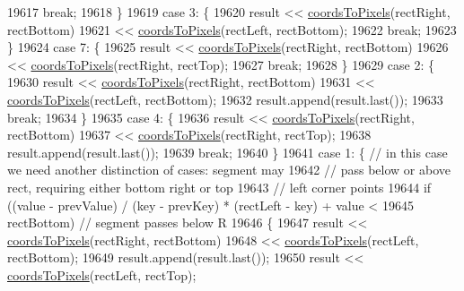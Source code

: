 \begin{DoxyCode}
19617       \textcolor{keywordflow}{break};
19618     \}
19619     \textcolor{keywordflow}{case} 3: \{
19620       result << \hyperlink{class_q_c_p_abstract_plottable_ade710a776104b14c1c835168ce1bfc5c}{coordsToPixels}(rectRight, rectBottom)
19621              << \hyperlink{class_q_c_p_abstract_plottable_ade710a776104b14c1c835168ce1bfc5c}{coordsToPixels}(rectLeft, rectBottom);
19622       \textcolor{keywordflow}{break};
19623     \}
19624     \textcolor{keywordflow}{case} 7: \{
19625       result << \hyperlink{class_q_c_p_abstract_plottable_ade710a776104b14c1c835168ce1bfc5c}{coordsToPixels}(rectRight, rectBottom)
19626              << \hyperlink{class_q_c_p_abstract_plottable_ade710a776104b14c1c835168ce1bfc5c}{coordsToPixels}(rectRight, rectTop);
19627       \textcolor{keywordflow}{break};
19628     \}
19629     \textcolor{keywordflow}{case} 2: \{
19630       result << \hyperlink{class_q_c_p_abstract_plottable_ade710a776104b14c1c835168ce1bfc5c}{coordsToPixels}(rectRight, rectBottom)
19631              << \hyperlink{class_q_c_p_abstract_plottable_ade710a776104b14c1c835168ce1bfc5c}{coordsToPixels}(rectLeft, rectBottom);
19632       result.append(result.last());
19633       \textcolor{keywordflow}{break};
19634     \}
19635     \textcolor{keywordflow}{case} 4: \{
19636       result << \hyperlink{class_q_c_p_abstract_plottable_ade710a776104b14c1c835168ce1bfc5c}{coordsToPixels}(rectRight, rectBottom)
19637              << \hyperlink{class_q_c_p_abstract_plottable_ade710a776104b14c1c835168ce1bfc5c}{coordsToPixels}(rectRight, rectTop);
19638       result.append(result.last());
19639       \textcolor{keywordflow}{break};
19640     \}
19641     \textcolor{keywordflow}{case} 1: \{ \textcolor{comment}{// in this case we need another distinction of cases: segment may}
19642               \textcolor{comment}{// pass below or above rect, requiring either bottom right or top}
19643               \textcolor{comment}{// left corner points}
19644       \textcolor{keywordflow}{if} ((value - prevValue) / (key - prevKey) * (rectLeft - key) + value <
19645           rectBottom) \textcolor{comment}{// segment passes below R}
19646       \{
19647         result << \hyperlink{class_q_c_p_abstract_plottable_ade710a776104b14c1c835168ce1bfc5c}{coordsToPixels}(rectRight, rectBottom)
19648                << \hyperlink{class_q_c_p_abstract_plottable_ade710a776104b14c1c835168ce1bfc5c}{coordsToPixels}(rectLeft, rectBottom);
19649         result.append(result.last());
19650         result << \hyperlink{class_q_c_p_abstract_plottable_ade710a776104b14c1c835168ce1bfc5c}{coordsToPixels}(rectLeft, rectTop);

\end{DoxyCode}
